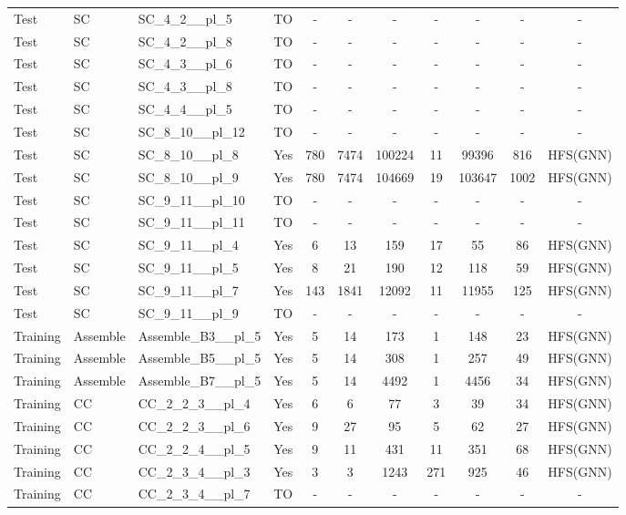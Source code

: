 \documentclass{article}
\begin{document}
\begin{tabular}{lllcccccccc}
Test & SC & SC\_4\_2\_\_pl\_5 & TO & - & - & - & - & - & - & - \\
Test & SC & SC\_4\_2\_\_pl\_8 & TO & - & - & - & - & - & - & - \\
Test & SC & SC\_4\_3\_\_pl\_6 & TO & - & - & - & - & - & - & - \\
Test & SC & SC\_4\_3\_\_pl\_8 & TO & - & - & - & - & - & - & - \\
Test & SC & SC\_4\_4\_\_pl\_5 & TO & - & - & - & - & - & - & - \\
Test & SC & SC\_8\_10\_\_pl\_12 & TO & - & - & - & - & - & - & - \\
Test & SC & SC\_8\_10\_\_pl\_8 & Yes & 780 & 7474 & 100224 & 11 & 99396 & 816 & HFS(GNN) \\
Test & SC & SC\_8\_10\_\_pl\_9 & Yes & 780 & 7474 & 104669 & 19 & 103647 & 1002 & HFS(GNN) \\
Test & SC & SC\_9\_11\_\_pl\_10 & TO & - & - & - & - & - & - & - \\
Test & SC & SC\_9\_11\_\_pl\_11 & TO & - & - & - & - & - & - & - \\
Test & SC & SC\_9\_11\_\_pl\_4 & Yes & 6 & 13 & 159 & 17 & 55 & 86 & HFS(GNN) \\
Test & SC & SC\_9\_11\_\_pl\_5 & Yes & 8 & 21 & 190 & 12 & 118 & 59 & HFS(GNN) \\
Test & SC & SC\_9\_11\_\_pl\_7 & Yes & 143 & 1841 & 12092 & 11 & 11955 & 125 & HFS(GNN) \\
Test & SC & SC\_9\_11\_\_pl\_9 & TO & - & - & - & - & - & - & - \\
Training & Assemble & Assemble\_B3\_\_pl\_5 & Yes & 5 & 14 & 173 & 1 & 148 & 23 & HFS(GNN) \\
Training & Assemble & Assemble\_B5\_\_pl\_5 & Yes & 5 & 14 & 308 & 1 & 257 & 49 & HFS(GNN) \\
Training & Assemble & Assemble\_B7\_\_pl\_5 & Yes & 5 & 14 & 4492 & 1 & 4456 & 34 & HFS(GNN) \\
Training & CC & CC\_2\_2\_3\_\_pl\_4 & Yes & 6 & 6 & 77 & 3 & 39 & 34 & HFS(GNN) \\
Training & CC & CC\_2\_2\_3\_\_pl\_6 & Yes & 9 & 27 & 95 & 5 & 62 & 27 & HFS(GNN) \\
Training & CC & CC\_2\_2\_4\_\_pl\_5 & Yes & 9 & 11 & 431 & 11 & 351 & 68 & HFS(GNN) \\
Training & CC & CC\_2\_3\_4\_\_pl\_3 & Yes & 3 & 3 & 1243 & 271 & 925 & 46 & HFS(GNN) \\
Training & CC & CC\_2\_3\_4\_\_pl\_7 & TO & - & - & - & - & - & - & - \\

\end{tabular}
\end{document}
